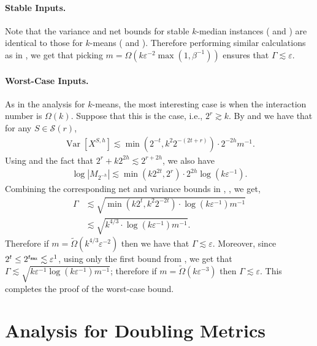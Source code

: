 \documentclass[11pt]{article}
\theoremstyle{restate}
\theoremstyle{definition}
\newcommand{\eps}{\ensuremath{\varepsilon}}
\DeclareMathOperator*{\var}{\mathrm{Var}}
\newcommand{\tmax}{t_\ensuremath{\textnormal{\texttt{max}}}}
\begin{document}
\paragraph{Stable Inputs.} Note that the variance and net bounds for stable $k$-median instances ( and ) are identical to those for $k$-means ( and ). Therefore performing similar calculations as in , we get that picking $m = \Omega(k \eps^{-2} \max(1, \beta^{-1}))$ ensures that $\Gamma \lesssim \eps$.


\paragraph{Worst-Case Inputs.} As in the analysis for $k$-means, the most interesting case is when the interaction number is $\Omega(k)$. Suppose that this is the case, i.e., $2^r \gtrsim k$.  By  and  we have that for any $S \in \mathcal{S}(r)$,
\begin{align}\label{eq: combine-variance}
    \var[X^{S,h}] \lesssim  \min(2^{-t}, k^2 2^{-(2t+r)}) \cdot 2^{-2h} m^{-1}.
\end{align}
Using  and the fact that $2^r + k2^{2h} \lesssim 2^{r+2h}$, we also have
\begin{align}\label{eq: combine-net}
    \log |M_{2^{-h}}| \lesssim  \min(k2^{2t}, 2^{r}) \cdot 2^{2h} \log(k\eps^{-1}).
\end{align}
Combining the corresponding net and variance bounds in , , we get,
\begin{align}
    \Gamma  &\lesssim \sqrt{\min(k2^{t}, k^2 2^{-2t}) \cdot \log(k \eps^{-1})m^{-1}} \label{eq: interm-combine-kmedian}\\
    &\lesssim \sqrt{k^{4/3} \cdot \log(k \eps^{-1})m^{-1}}.
\end{align}
Therefore  if $m =  \tilde{\Omega}(k^{4/3} \eps^{-2})$ then we have that $\Gamma \lesssim \eps$. Moreover, since $2^t \leq 2^{\tmax}\lesssim \eps^{1}$, using only the first bound from , we get that  $\Gamma \lesssim \sqrt{k\eps^{-1}\log(k \eps^{-1}) m^{-1}}$; therefore if  $m = \tilde{\Omega}(k\eps^{-3})$ then $\Gamma \lesssim  \eps$. This completes the proof of the worst-case bound.

\section{Analysis for Doubling Metrics}\label{app: doubling}
\end{document}
